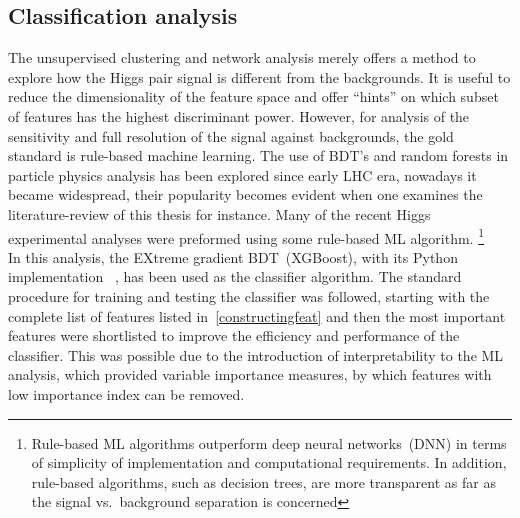 \subsection{Classification analysis }
The unsupervised clustering and network analysis merely offers a method to explore how the Higgs pair signal is different from the backgrounds. It is useful to reduce the dimensionality of the feature space and offer ``hints'' on which subset of features has the highest discriminant power. However, for analysis of the sensitivity and full resolution of the signal against backgrounds, the gold standard is rule-based machine learning. 
The use of BDT's and random forests in particle physics analysis has been explored since early LHC era,  nowadays it became widespread, their popularity becomes evident when one examines the literature-review of this thesis for instance. Many of the recent Higgs experimental analyses were preformed using some rule-based ML algorithm. \footnote{Rule-based ML algorithms outperform deep neural networks~(DNN) in terms of simplicity of implementation and computational requirements. In addition, rule-based algorithms, such as decision trees, are more transparent as far as the signal vs.~background separation is concerned }\\
In this analysis, the EXtreme gradient BDT~(XGBoost), with its Python implementation ~\cite{10.1145/2939672.2939785}, has been used as the classifier algorithm. The standard procedure for training and testing the classifier was followed, starting with the complete list of features listed in~\autoref{constructingfeat} and then the most important features were shortlisted to improve the efficiency and performance of the classifier. This was possible due to the introduction of interpretability to the ML analysis, which provided variable importance measures, by which features with low importance index can be removed. \\

